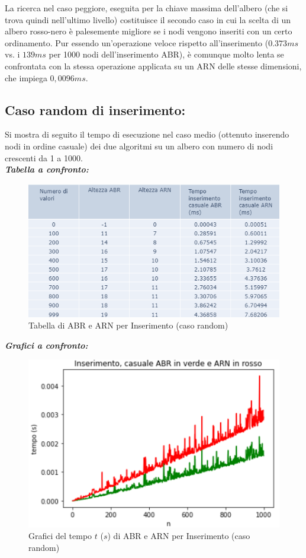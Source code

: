 \documentclass[]{article}
\begin{document}
La ricerca nel caso peggiore, eseguita per la chiave massima dell'albero (che si trova quindi nell'ultimo livello) costituisce il secondo caso in cui la scelta di un albero rosso-nero è palesemente migliore se i nodi vengono inseriti con un certo ordinamento. Pur essendo un'operazione veloce rispetto all'inserimento ($0.373 ms$ vs. i $139 ms$ per 1000 nodi dell'inserimento ABR), è comunque molto lenta se confrontata con la stessa operazione applicata su un ARN delle stesse dimensioni, che impiega $0,0096 ms$.\\


\subsection {Caso random di inserimento:} 
Si mostra di seguito il tempo di esecuzione nel caso medio (ottenuto inserendo nodi in ordine casuale) dei due algoritmi su un albero con numero di nodi crescenti da 1 a 1000. \\

\noindent \textit{\bf{Tabella a confronto:}}
\begin{figure}[ht]
\centering
\includegraphics[]{TabellaInserimentoCasuale}
\caption{Tabella di ABR e ARN per Inserimento (caso random)}
\label{fig:fig5}
\end{figure}


\noindent \textit{\bf{Grafici a confronto:}}
\begin{figure}[ht]
\centering
\includegraphics[width=.7\textwidth, height=.6\textheight, keepaspectratio]{GraficoInserimentoCasuale}
\vspace{-5mm}
\caption{Grafici del tempo $t$ ($s$) di ABR e ARN per Inserimento (caso random)}
\label{fig:fig6}
\end{figure}
\end{document}
